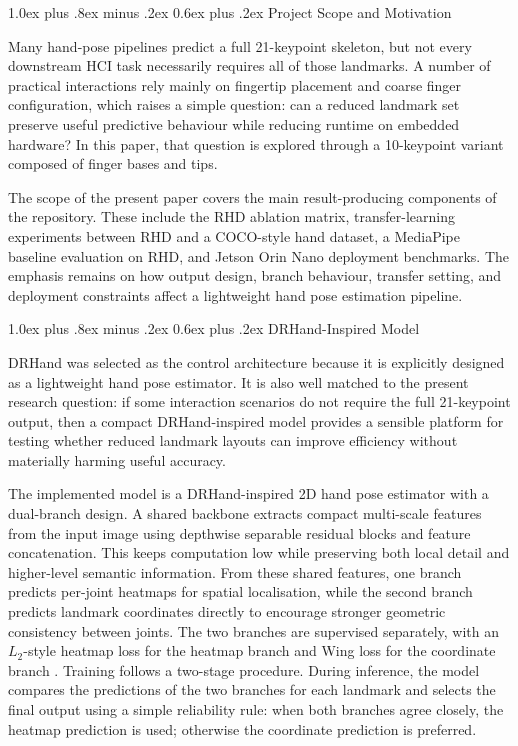 \documentclass[10pt,letterpaper,twocolumn]{article}
\makeatletter
\renewcommand\subsection{\@startsection{subsection}{2}{\z@}%
  {1.0ex plus .8ex minus .2ex}%
  {0.6ex plus .2ex}%
  {\normalfont\itshape}}
\makeatother
\begin{document}
\subsection{Project Scope and Motivation}

Many hand-pose pipelines predict a full 21-keypoint skeleton, but not every downstream HCI task necessarily requires all of those landmarks. A number of practical interactions rely mainly on fingertip placement and coarse finger configuration, which raises a simple question: can a reduced landmark set preserve useful predictive behaviour while reducing runtime on embedded hardware? In this paper, that question is explored through a 10-keypoint variant composed of finger bases and tips.

The scope of the present paper covers the main result-producing components of the repository. These include the RHD ablation matrix, transfer-learning experiments between RHD and a COCO-style hand dataset, a MediaPipe baseline evaluation on RHD, and Jetson Orin Nano deployment benchmarks. The emphasis remains on how output design, branch behaviour, transfer setting, and deployment constraints affect a lightweight hand pose estimation pipeline.

\subsection{DRHand-Inspired Model}

DRHand was selected as the control architecture because it is explicitly designed as a lightweight hand pose estimator. It is also well matched to the present research question: if some interaction scenarios do not require the full 21-keypoint output, then a compact DRHand-inspired model provides a sensible platform for testing whether reduced landmark layouts can improve efficiency without materially harming useful accuracy.

The implemented model is a DRHand-inspired 2D hand pose estimator with a dual-branch design. A shared backbone extracts compact multi-scale features from the input image using depthwise separable residual blocks and feature concatenation. This keeps computation low while preserving both local detail and higher-level semantic information. From these shared features, one branch predicts per-joint heatmaps for spatial localisation, while the second branch predicts landmark coordinates directly to encourage stronger geometric consistency between joints. The two branches are supervised separately, with an $L_2$-style heatmap loss for the heatmap branch and Wing loss for the coordinate branch \cite{wingloss}. Training follows a two-stage procedure. During inference, the model compares the predictions of the two branches for each landmark and selects the final output using a simple reliability rule: when both branches agree closely, the heatmap prediction is used; otherwise the coordinate prediction is preferred.
\end{document}
